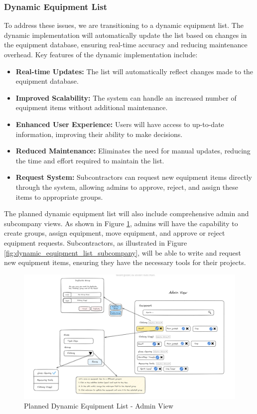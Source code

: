\subsubsection{Dynamic Equipment List}
To address these issues, we are transitioning to a dynamic equipment list. The dynamic implementation will automatically update the list based on changes in the equipment database, ensuring real-time accuracy and reducing maintenance overhead. Key features of the dynamic implementation include:
\begin{itemize}
    \item \textbf{Real-time Updates:} The list will automatically reflect changes made to the equipment database.
    \item \textbf{Improved Scalability:} The system can handle an increased number of equipment items without additional maintenance.
    \item \textbf{Enhanced User Experience:} Users will have access to up-to-date information, improving their ability to make decisions.
    \item \textbf{Reduced Maintenance:} Eliminates the need for manual updates, reducing the time and effort required to maintain the list.
    \item \textbf{Request System:} Subcontractors can request new equipment items directly through the system, allowing admins to approve, reject, and assign these items to appropriate groups.
\end{itemize}

The planned dynamic equipment list will also include comprehensive admin and subcompany views. As shown in Figure \ref{fig:dynamic_equipment_list_admin}, admins will have the capability to create groups, assign equipment, move equipment, and approve or reject equipment requests. Subcontractors, as illustrated in Figure \ref{fig:dynamic_equipment_list_subcompany}, will be able to write and request new equipment items, ensuring they have the necessary tools for their projects.

\begin{figure}[H]
    \centering
    \includegraphics[width=1\textwidth]{src/assets/chapters/DynamicEquipementAdmin.PNG}
    \caption{Planned Dynamic Equipment List - Admin View}
    \label{fig:dynamic_equipment_list_admin}
\end{figure}


